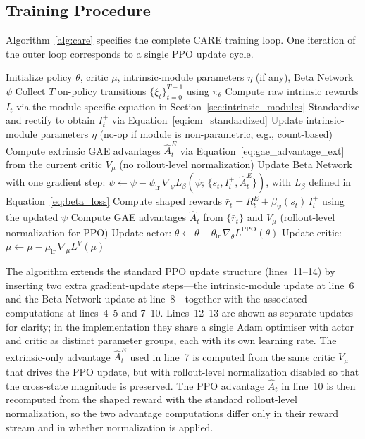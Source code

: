 \subsection{Training Procedure}
\label{sec:training_procedure}

Algorithm~\ref{alg:care} specifies the complete CARE training loop. One iteration of the outer loop corresponds to a single PPO update cycle.

\begin{algorithm}[H]
\caption{CARE training loop with PPO and an intrinsic reward module.}
\label{alg:care}
\begin{algorithmic}[1]
\State Initialize policy $\theta$, critic $\mu$, intrinsic-module parameters $\eta$ (if any), Beta Network $\psi$
    \State Collect $T$ on-policy transitions $\{\xi_t\}_{t=0}^{T-1}$ using $\pi_\theta$
    \State Compute raw intrinsic rewards $I_t$ via the module-specific equation in Section~\ref{sec:intrinsic_modules}
    \State Standardize and rectify to obtain $I_t^+$ via Equation~\eqref{eq:icm_standardized}
    \State Update intrinsic-module parameters $\eta$ (no-op if module is non-parametric, e.g., count-based)
    \State Compute extrinsic GAE advantages $\hat A_t^{E}$ via Equation~\eqref{eq:gae_advantage_ext} from the current critic $V_\mu$ (no rollout-level normalization)
    \State Update Beta Network with one gradient step: $\psi \gets \psi - \psi_\text{lr}\, \nabla_\psi L_\beta(\psi;\, \{s_t, I_t^+, \hat A_t^{E}\})$, with $L_\beta$ defined in Equation~\eqref{eq:beta_loss}
    \State Compute shaped rewards $\bar r_t = R_t^E + \beta_\psi(s_t)\, I_t^+$ using the updated $\psi$
    \State Compute GAE advantages $\hat A_t$ from $\{\bar r_t\}$ and $V_\mu$ (rollout-level normalization for PPO)
        \State Update actor: $\theta \gets \theta - \theta_\text{lr}\, \nabla_\theta L^\text{PPO}(\theta)$
        \State Update critic: $\mu \gets \mu - \mu_\text{lr}\, \nabla_\mu L^V(\mu)$
    \EndFor
\EndFor
\end{algorithmic}
\end{algorithm}

The algorithm extends the standard PPO update structure (lines~11--14) by inserting two extra gradient-update steps---the intrinsic-module update at line~6 and the Beta Network update at line~8---together with the associated computations at lines~4--5 and 7--10. Lines~12--13 are shown as separate updates for clarity; in the implementation they share a single Adam optimiser with actor and critic as distinct parameter groups, each with its own learning rate. The extrinsic-only advantage $\hat A_t^{E}$ used in line~7 is computed from the same critic $V_\mu$ that drives the PPO update, but with rollout-level normalization disabled so that the cross-state magnitude is preserved. The PPO advantage $\hat A_t$ in line~10 is then recomputed from the shaped reward with the standard rollout-level normalization, so the two advantage computations differ only in their reward stream and in whether normalization is applied.

